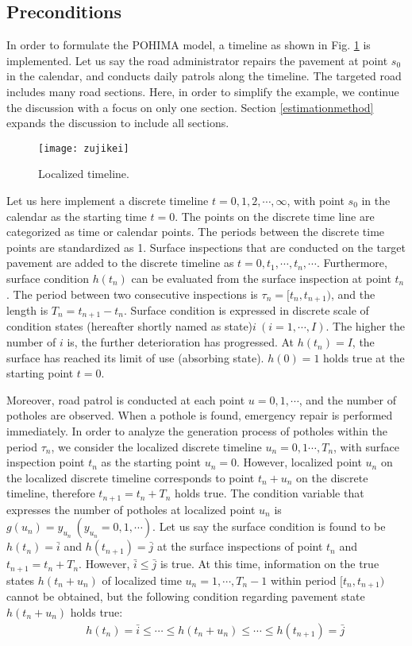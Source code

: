 \documentclass[Journal]{ascelike}
\begin{document}
\subsection{Preconditions}\label{sub21}
In order to formulate the POHIMA model, a timeline as shown in Fig. \ref{4jikanjiku} is implemented. Let us say the road administrator repairs the pavement at point $s_0$ in the calendar, and conducts daily patrols along the timeline. The targeted road includes many road sections. Here, in order to simplify the example, we continue the discussion with a focus on only one section. Section \ref{estimationmethod} expands the discussion to include all sections.
%
\begin{figure}[t]
\begin{center}
\texttt{[image: zujikei]} 
\end{center} 
\caption{Localized timeline.} 
\label{4jikanjiku}
\end{figure} 
%
Let us here implement a discrete timeline $t=0,1,2,\cdots,\infty$, with point $s_0$ in the calendar as the starting time $t=0$. The points on the discrete time line are categorized as time or calendar points. The periods between the discrete time points are standardized as 1. Surface inspections that are conducted on the target pavement are added to the discrete timeline as $t=0,t_1,\cdots,t_n,\cdots$. Furthermore, surface condition $h(t_n)$ can be evaluated from the surface inspection at point $t_n$. The period between two consecutive inspections is $\tau_n=[t_n,t_{n+1})$, and the length is $T_n=t_{n+1}-t_n$. Surface condition is expressed in discrete scale of condition states (hereafter shortly named as state)$i~(i=1,\cdots,I)$. The higher the number of $i$ is, the further deterioration has progressed. At $h(t_n)=I$, the surface has reached its limit of use (absorbing state). $h(0)=1$ holds true at the starting point $t=0$. 

Moreover, road patrol is conducted at each point $u=0,1,\cdots$, and the number of potholes are observed. When a pothole is found, emergency repair is performed immediately. In order to analyze the generation process of potholes within the period $\tau_n$, we consider the localized discrete timeline $u_n=0,1\cdots,T_n$, with surface inspection point $t_n$ as the starting point $u_n=0$. However, localized point $u_n$ on the localized discrete timeline corresponds to point $t_n+u_n$ on the discrete timeline, therefore $t_{n+1}=t_n+T_n$ holds true. The condition variable that expresses the number of potholes at localized point $u_n$ is $g(u_n)=y_{u_n}~(y_{u_n}=0,1,\cdots)$. Let us say the surface condition is found to be $h(t_n)=\bar{i}$ and $h(t_{n+1})=\bar{j}$ at the surface inspections of point $t_n$ and $t_{n+1}=t_n+T_n$. However, $\bar{i} \leq \bar{j}$ is true. At this time, information on the true states $h(t_n+u_n)$ of localized time $u_n=1,\cdots,T_n-1$ within period $[t_n,t_{n+1})$ cannot be obtained, but the following condition regarding pavement state $h(t_n+u_n)$ holds true:
\begin{eqnarray}
&& h(t_n)=\bar{i}\leq \cdots \leq  h(t_n+u_n) \leq \cdots \leq h(t_{n+1})=\bar{j}\label{4uu} 
\end{eqnarray}
\end{document}
